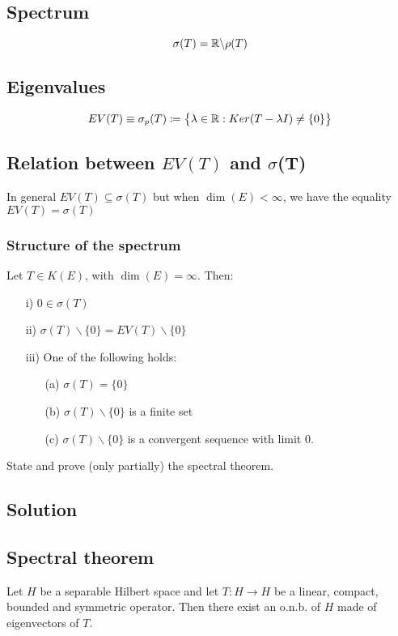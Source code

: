 \subsection{Spectrum}
\[\sigma(T)=\mathbb{R}\backslash\rho(T)\]

\subsection{Eigenvalues}
\[EV(T)\equiv\sigma_p(T)\coloneqq\big\{\lambda\in\mathbb{R}:Ker(T-\lambda I)\neq \{0\}\big\}\]

\subsection{Relation between \texorpdfstring{$EV(T)$}{the set of Eigenvalues} and \texorpdfstring{$\sigma$(T)}{the spectrum}}
In general $EV(T)\displaystyle\subseteq \sigma(T)$ but when $\dim(E)<\infty$, we have the equality $EV(T)= \sigma(T)$

\subsubsection{Structure of the spectrum}
Let $T\in K(E)$, with $\dim(E)=\infty$. Then:

\begin{itemize}
    \item[i)] $0 \in  \sigma(T)$
    \item[ii)] $\sigma(T)\backslash \{0\} = EV(T)\backslash \{0\} $
    \item[iii)] One of the following holds:
    \begin{itemize}
        \item[(a)] $\sigma(T)= \{0\}$    
        \item[(b)] $\sigma(T)\backslash \{0\}$ is a finite set
        \item[(c)] $\sigma(T)\backslash \{0\}$ is a convergent sequence with limit 0.
    \end{itemize}
\end{itemize}


\question
State and prove (only partially) the spectral theorem.

\subsection*{Solution}

\subsection{Spectral theorem}
Let $H$ be a separable Hilbert space and let $T:H\to H $ be a linear, compact, bounded and symmetric operator. Then there exist an o.n.b. of $H$ made of eigenvectors of $T$.

